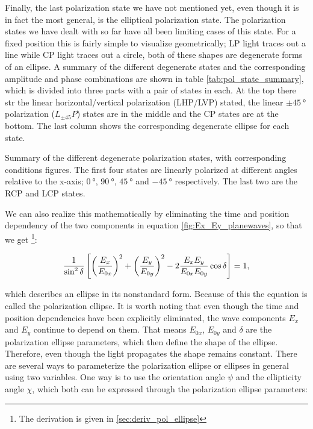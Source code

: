 Finally, the last polarization state we have not mentioned yet, even though it is in fact the most general, is the elliptical polarization state. The polarization states we have dealt with so far have all been limiting cases of this state. For a fixed position this is fairly simple to visualize geometrically; LP light traces out a line while CP light traces out a circle, both of these shapes are degenerate forms of an ellipse. A summary of the different degenerate states and the corresponding amplitude and phase combinations are shown in table \ref{tab:pol_state_summary}, which is divided into three parts with a pair of states in each. At the top there str the linear horizontal/vertical polarization (LHP/LVP) stated, the linear $\pm\SI{45}{\degree}$ polarization ($L_{\pm45}P$) states are in the middle and the CP states are at the bottom. The last column shows the corresponding degenerate ellipse for each state.

\begin{table}[h]
    \centering
    
    \caption{Summary of the different degenerate polarization states, with corresponding conditions figures. The first four states are linearly polarized at different angles relative to the x-axis; $\SI{0}{\degree}$, $\SI{90}{\degree}$, $\SI{45}{\degree}$ and $\SI{-45}{\degree}$ respectively. The last two are the RCP and LCP states.}
    \label{tab:pol_state_summary}
\end{table}

We can also realize this mathematically by eliminating the time and position dependency of the two components in equation \ref{fig:Ex_Ey_planewaves}, so that we get \footnote{The derivation is given in \ref{sec:deriv_pol_ellipse}}:

\begin{equation}
    \centering
    \frac{1}{\sin^2 \delta} \left[ \left(\frac{E_x}{E_{0x}}\right)^2+\left(\frac{E_y}{E_{0y}}\right)^2-2\frac{E_x E_y}{E_{0x} E_{0y}}\cos \delta \right]=1,
\end{equation}

which describes an ellipse in its nonstandard form. Because of this the equation is called the polarization ellipse. It is worth noting that even though the time and position dependencies have been explicitly eliminated, the wave components $E_x$ and $E_y$ continue to depend on them. That means $E_{0x}$, $E_{0y}$ and $\delta$ are the polarization ellipse parameters, which then define the shape of the ellipse. Therefore, even though the light propagates the shape remains constant. There are several ways to parameterize the polarization ellipse or ellipses in general using two variables. One way is to use the orientation angle $\psi$ and the ellipticity angle $\chi$, which both can be expressed through the polarization ellipse parameters: 

